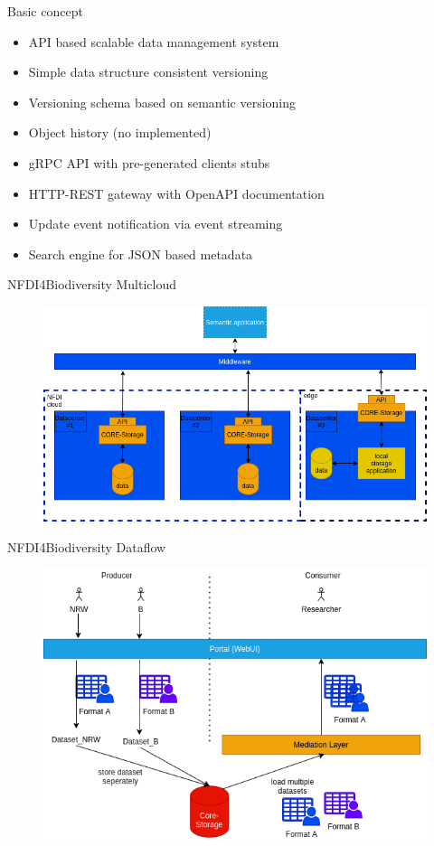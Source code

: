 \documentclass[aspectratio=169]{beamer}
\begin{document}
	\begin{frame}{Basic concept}
		\begin{itemize}
			\item API based scalable data management system
			\item Simple data structure consistent versioning
			\item Versioning schema based on semantic versioning
			\item Object history (no implemented)
			\item gRPC API with pre-generated clients stubs
			\item HTTP-REST gateway with OpenAPI documentation
			\item Update event notification via event streaming
			\item Search engine for JSON based metadata
		\end{itemize}
		
	\end{frame}
	\begin{frame}{NFDI4Biodiversity Multicloud}
		\begin{figure}
			\includegraphics[scale=0.52]{../../images/NFDIMulticloudconcept.png}
		\end{figure}
	\end{frame}
	\begin{frame}{NFDI4Biodiversity Dataflow}
		\begin{figure}
			\includegraphics[scale=0.52]{../../images/DataFlowOdonata.png}
		\end{figure}
	\end{frame}
\end{document}
